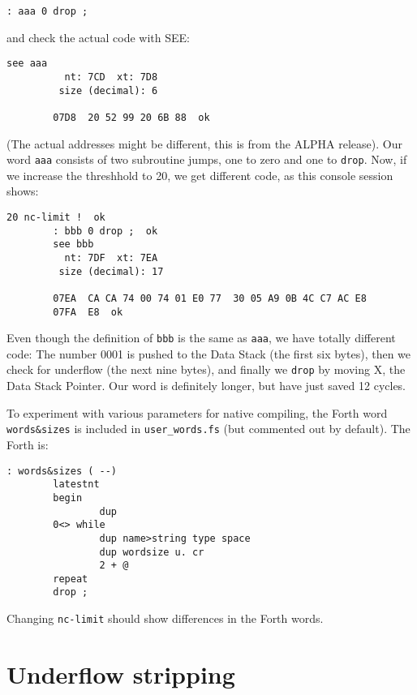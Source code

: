 \begin{lstlisting}[frame=single]
        : aaa 0 drop ;
\end{lstlisting}

and check the actual code with SEE:

\begin{lstlisting}[frame=single]
        see aaa
          nt: 7CD  xt: 7D8
         size (decimal): 6

        07D8  20 52 99 20 6B 88  ok
\end{lstlisting}

(The actual addresses might be different, this is from the ALPHA release).  Our
word \texttt{aaa} consists of two subroutine jumps, one to zero and one to
\texttt{drop}. Now, if we increase the threshhold to 20, we get different code,
as this console session shows:

\begin{lstlisting}[frame=single]
        20 nc-limit !  ok
        : bbb 0 drop ;  ok
        see bbb
          nt: 7DF  xt: 7EA
         size (decimal): 17

        07EA  CA CA 74 00 74 01 E0 77  30 05 A9 0B 4C C7 AC E8
        07FA  E8  ok
\end{lstlisting}

Even though the definition of \texttt{bbb} is the same as \texttt{aaa}, we have
totally different code: The number 0001 is pushed to the Data Stack (the first
six bytes), then we check for underflow (the next nine bytes),
and finally we \texttt{drop} by moving X, the Data Stack
Pointer. Our word is definitely longer, but have just saved 12 cycles.

To experiment with various parameters for native compiling, the Forth word
\texttt{words\&sizes} is included in \texttt{user\_words.fs} (but commented out 
by default). The Forth is:

\begin{lstlisting}[frame=single]
: words&sizes ( --)
        latestnt
        begin
                dup
        0<> while
                dup name>string type space
                dup wordsize u. cr      
                2 + @
        repeat
        drop ;
\end{lstlisting}

Changing \texttt{nc-limit} should show differences in the Forth words.



\section{Underflow stripping}


